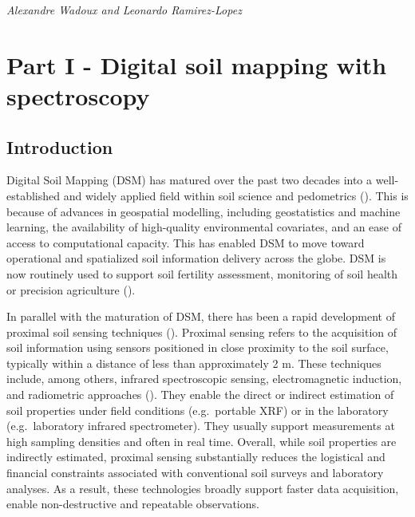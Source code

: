 \documentclass[
  10pt,
  b5paper,
  oneside]{book}
\begin{document}
\emph{Alexandre Wadoux and Leonardo Ramirez-Lopez}

\chapter{Part I - Digital soil mapping with spectroscopy}\label{part-i---digital-soil-mapping-with-spectroscopy}

\section{Introduction}\label{introduction-1}

Digital Soil Mapping (DSM) has matured over the past two decades into a well-established and widely applied field within soil science and pedometrics (). This is because of advances in geospatial modelling, including geostatistics and machine learning, the availability of high-quality environmental covariates, and an ease of access to computational capacity. This has enabled DSM to move toward operational and spatialized soil information delivery across the globe. DSM is now routinely used to support soil fertility assessment, monitoring of soil health or precision agriculture ().

In parallel with the maturation of DSM, there has been a rapid development of proximal soil sensing techniques (). Proximal sensing refers to the acquisition of soil information using sensors positioned in close proximity to the soil surface, typically within a distance of less than approximately 2 m. These techniques include, among others, infrared spectroscopic sensing, electromagnetic induction, and radiometric approaches (). They enable the direct or indirect estimation of soil properties under field conditions (e.g.~portable XRF) or in the laboratory (e.g.~laboratory infrared spectrometer). They usually support measurements at high sampling densities and often in real time. Overall, while soil properties are indirectly estimated, proximal sensing substantially reduces the logistical and financial constraints associated with conventional soil surveys and laboratory analyses. As a result, these technologies broadly support faster data acquisition, enable non-destructive and repeatable observations.
\end{document}
